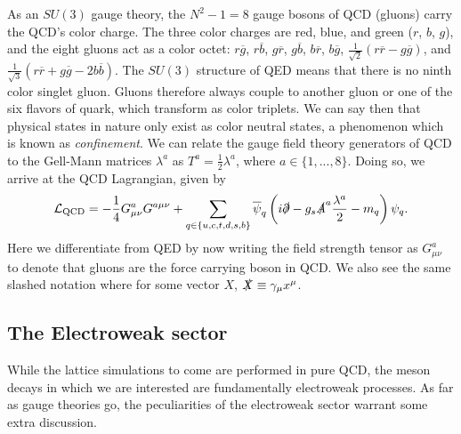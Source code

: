As an $SU(3)$ gauge theory, the $N^2 - 1=8$ gauge bosons of QCD (gluons) carry the QCD's color charge.  The three color charges are red, blue, and green ($r$, $b$, $g$), and the eight gluons act as a color octet: $r\overline{g}$, $r\overline{b}$, $g\overline{r}$, $g\overline{b}$, $b\overline{r}$, $b\overline{g}$, $\frac{1}{\sqrt{2}}(r\overline{r} - g\overline{g})$, and $\frac{1}{\sqrt{3}}(r\overline{r} + g\overline{g} - 2b\overline{b})$.  The $SU(3)$ structure of QED means that there is no ninth color singlet gluon.  Gluons therefore always couple to another gluon or one of the six flavors of quark,  which transform as color triplets.  We can say then that physical states in nature only exist as color neutral states, a phenomenon which is known as \textit{confinement}. We can relate the gauge field theory generators of QCD to the Gell-Mann matrices $\lambda^a$ as $T^a = \frac{1}{2}\lambda^a$, where $a\in\{1,...,8\}$. Doing so, we arrive at the QCD Lagrangian, given by
\begin{equation}\label{eq:QCD_Lagrangian}
    \mathcal{L}_\mathrm{QCD} = -\frac{1}{4}G^a_{\mu\nu}G^{a\mu\nu} +
    \sum_{q\in\{u,c,t,d,s,b\}} \overline{\psi}_q \left(i\slashed{\partial} - g_s \slashed{A}^a \frac{\lambda^a}{2} -m_q  \right) \psi_q.
\end{equation}
Here we differentiate from QED by now writing the field strength tensor as $G^a_{\mu\nu}$ to denote that gluons are the force carrying boson in QCD.  We also see the same slashed notation where for some vector $X$, $\slashed{X} \equiv \gamma_\mu x^\mu$.%


\subsection{The Electroweak sector}\label{sec:electroweak}
While the lattice simulations to come are performed in pure QCD, the meson decays in which we are interested are fundamentally electroweak processes. As far as gauge theories go, the peculiarities of the electroweak sector \cite{SALAM1964168, PhysRevLett.19.1264} warrant some extra discussion.  

